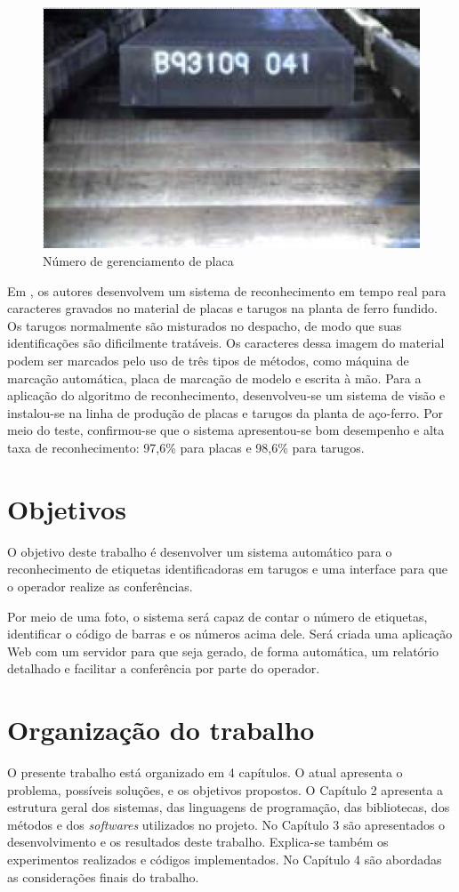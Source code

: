 \begin{figure}[htbp]
	\centering
	\includegraphics[width=0.5\linewidth]{figuras/Steel/SMN.png}
	\caption{Número de gerenciamento de placa}
	\label{fig:SMN}
\end{figure}


Em , os autores desenvolvem um sistema de reconhecimento em tempo real para caracteres gravados no material de placas e tarugos na planta de ferro fundido. 
%
Os tarugos normalmente são misturados no despacho, de modo que suas identificações são dificilmente tratáveis. Os caracteres dessa imagem do material podem ser marcados pelo uso de três tipos de métodos, como máquina de marcação automática, placa de marcação de modelo e escrita à mão. Para a aplicação do algoritmo de reconhecimento, desenvolveu-se um sistema de visão e instalou-se na linha de produção de placas e tarugos da planta de aço-ferro. Por meio do teste, confirmou-se que o sistema apresentou-se bom desempenho e alta taxa de reconhecimento: 97,6\% para placas e 98,6\% para tarugos.

\section{Objetivos} 

O objetivo deste trabalho é desenvolver um sistema automático para o reconhecimento de etiquetas identificadoras em tarugos e uma interface para que o operador realize as conferências. 

Por meio de uma foto, o sistema será capaz de contar o número de etiquetas, identificar o código de barras e os números acima dele. Será criada uma aplicação Web com um servidor para que seja gerado, de forma automática, um relatório detalhado e facilitar a conferência por parte do operador.

\section{Organização do trabalho}

O presente trabalho está organizado em 4 capítulos. O atual apresenta o problema, possíveis soluções, e os objetivos propostos.
%
O Capítulo 2 apresenta a estrutura geral dos sistemas, das linguagens de programação, das bibliotecas, dos métodos e dos \textit{softwares} utilizados no projeto.
%
No Capítulo 3 são apresentados o desenvolvimento e os resultados deste trabalho. Explica-se também os experimentos realizados e códigos implementados.
%
No Capítulo 4 são abordadas as considerações finais do trabalho.